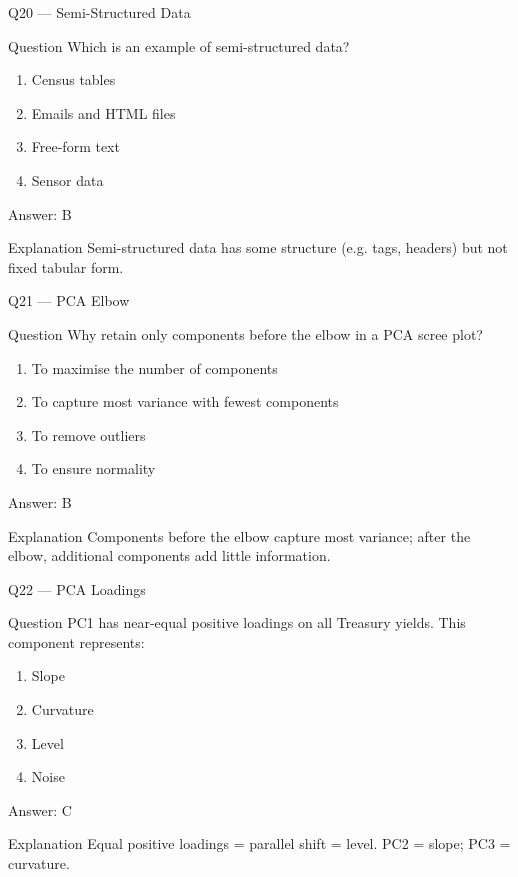 \documentclass[aspectratio=169,8pt]{beamer}
\begin{document}
	\begin{frame}{Q20 --- Semi-Structured Data}
		\begin{block}{Question}
			Which is an example of semi-structured data?
		\end{block}
		\begin{enumerate}
			\item Census tables
			\item Emails and HTML files
			\item Free-form text
			\item Sensor data
		\end{enumerate}
		\begin{exampleblock}{Answer: B}\end{exampleblock}
		\begin{block}{Explanation}
			Semi-structured data has some structure (e.g. tags, headers) but not fixed tabular form.
		\end{block}
	\end{frame}
	
	\begin{frame}{Q21 --- PCA Elbow}
		\begin{block}{Question}
			Why retain only components before the elbow in a PCA scree plot?
		\end{block}
		\begin{enumerate}
			\item To maximise the number of components
			\item To capture most variance with fewest components
			\item To remove outliers
			\item To ensure normality
		\end{enumerate}
		\begin{exampleblock}{Answer: B}\end{exampleblock}
		\begin{block}{Explanation}
			Components before the elbow capture most variance; after the elbow, additional components add little information.
		\end{block}
	\end{frame}
	
	\begin{frame}{Q22 --- PCA Loadings}
		\begin{block}{Question}
			PC1 has near-equal positive loadings on all Treasury yields. This component represents:
		\end{block}
		\begin{enumerate}
			\item Slope
			\item Curvature
			\item Level
			\item Noise
		\end{enumerate}
		\begin{exampleblock}{Answer: C}\end{exampleblock}
		\begin{block}{Explanation}
			Equal positive loadings = parallel shift = level. PC2 = slope; PC3 = curvature.
		\end{block}
	\end{frame}
	
\end{document}
